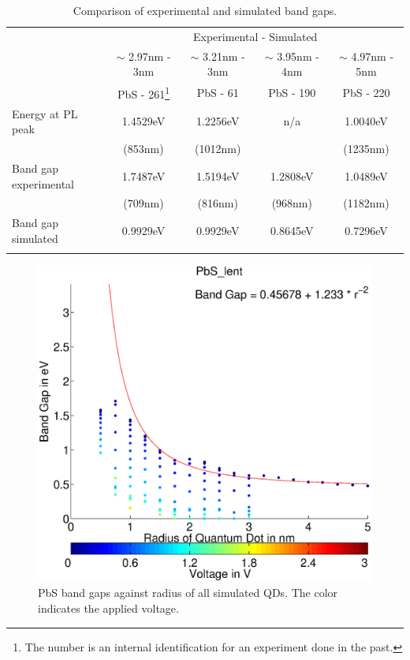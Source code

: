 	\begin{table}[t]
		\centering
		\begin{tabularx}{\textwidth}{Xc|c|c|c}
															& \multicolumn{4}{c}{Experimental \diameter - Simulated \diameter}														\\
															&	$\sim$ 2.97nm	- 3nm		&	$\sim$ 3.21nm - 3nm &	$\sim$ 3.95nm	-	4nm		&	$\sim$ 4.97nm - 5nm		\\
															&	PbS - 261\footnote{The number is an internal identification for an experiment done in the past.}	& PbS - 61						&	PbS - 190							&	PbS - 220							\\
			\hline
			Energy at \gls{PL} peak	&	1.4529eV 							&	1.2256eV 						&	n/a										&	1.0040eV 							\\
															&	(853nm)								&	(1012nm)						&												&	(1235nm)							\\
			Band gap experimental		&	1.7487eV 							&	1.5194eV 						&	1.2808eV 							&	1.0489eV 							\\
															&	(709nm)								&	(816nm)							&	(968nm)								&	(1182nm)							\\
			Band gap simulated			&	0.9929eV							&	0.9929eV						&	0.8645eV							&	0.7296eV							\\ \\
		\end{tabularx}
		\caption{Comparison of experimental and simulated band gaps.}
		\label{tbl:BandGap}
	\end{table}
	
	\begin{figure}[t]
		\includegraphics[width=\textwidth]{Fig/Plots/BandGap.eps}
		\caption{PbS band gaps against radius of all simulated \glspl{QD}. The color indicates the applied voltage.}
		\label{fig:BandGap}
	\end{figure}
	
